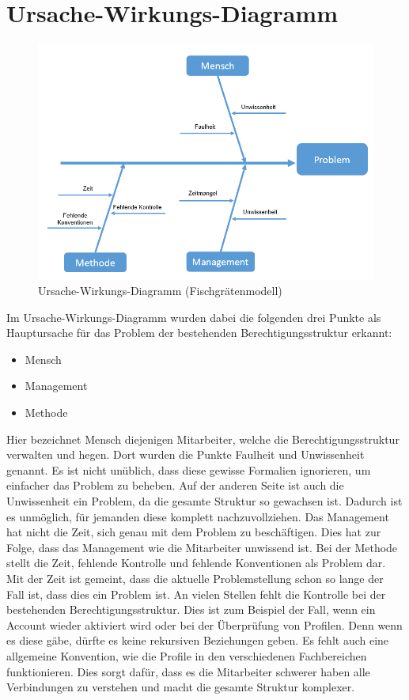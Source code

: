 \section{Ursache-Wirkungs-Diagramm}
\label{sec:intro:UWD}
\begin{figure}[h!]
 \centering
 \includegraphics[width=1\textwidth]{gfx/Picture/Fisch.PNG}
 \caption{Ursache-Wirkungs-Diagramm (Fischgrätenmodell)}
 \label{fig:Fisch}
\end{figure}
Im Ursache-Wirkungs-Diagramm wurden dabei die folgenden drei Punkte als Hauptursache für das Problem der bestehenden Berechtigungsstruktur erkannt:
\begin{itemize}
	\item Mensch
	\item Management
	\item Methode
\end{itemize}
Hier bezeichnet Mensch diejenigen Mitarbeiter, welche die Berechtigungsstruktur verwalten und hegen.
Dort wurden die Punkte Faulheit und Unwissenheit genannt.
Es ist nicht unüblich, dass diese gewisse Formalien ignorieren, um einfacher das Problem zu beheben.
Auf der anderen Seite ist auch die Unwissenheit ein Problem, da die gesamte Struktur so gewachsen ist.
Dadurch ist es unmöglich, für jemanden diese komplett nachzuvollziehen.
\newline
Das Management hat nicht die Zeit, sich genau mit dem Problem zu beschäftigen.
Dies hat zur Folge, dass das Management wie die Mitarbeiter unwissend ist.
\newline
Bei der Methode stellt die Zeit, fehlende Kontrolle und fehlende Konventionen als Problem dar.
Mit der Zeit ist gemeint, dass die aktuelle Problemstellung schon so lange der Fall ist, dass dies ein Problem ist.
An vielen Stellen fehlt die Kontrolle bei der bestehenden Berechtigungsstruktur.
Dies ist zum Beispiel der Fall, wenn ein Account wieder aktiviert wird oder bei der Überprüfung von Profilen.
Denn wenn es diese gäbe, dürfte es keine rekursiven Beziehungen geben.
Es fehlt auch eine allgemeine Konvention, wie die Profile in den verschiedenen Fachbereichen funktionieren.
Dies sorgt dafür, dass es die Mitarbeiter schwerer haben alle Verbindungen zu verstehen und macht die gesamte Struktur komplexer.